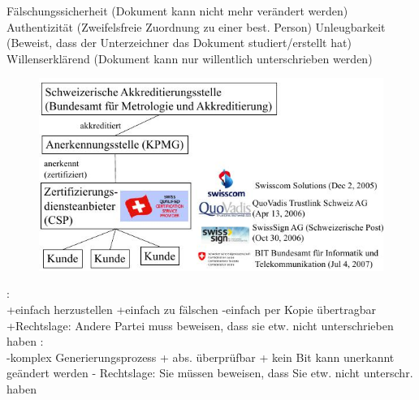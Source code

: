 \documentclass[ngerman,a4paper,12pt]{scrreprt}
\begin{document}
\ul
	\li Fälschungssicherheit (Dokument kann nicht mehr verändert werden)
	\li Authentizität (Zweifelsfreie Zuordnung zu einer best. Person)
	\li Unleugbarkeit (Beweist, dass der Unterzeichner das Dokument studiert/erstellt hat)
	\li Willenserklärend (Dokument kann nur willentlich unterschrieben werden)
\ulE

\begin{figure}[H]
	\centering
	\includegraphics[width=\textwidth]{img/V7.1.jpg}
	\caption{}
	\label{}
\end{figure}

\dl
	: \\
		\ul
			\li +einfach herzustellen
			\li +einfach zu fälschen
			\li -einfach per Kopie übertragbar
			\li +Rechtslage: Andere Partei muss beweisen, dass sie etw. nicht unterschrieben haben
		\ulE
	: \\
		\ul
			\li -komplex Generierungsprozess
			\li + abs. überprüfbar
			\li + kein Bit kann unerkannt geändert werden
			\li - Rechtslage: Sie müssen beweisen, dass Sie etw. nicht unterschr. haben
		\ulE
\dlE
\end{document}
